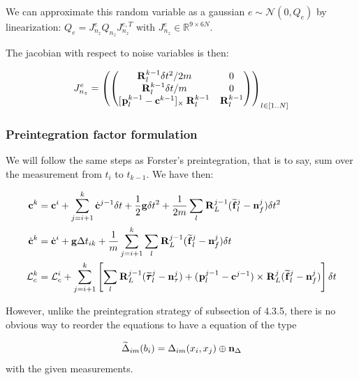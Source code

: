 \documentclass[11pt]{article}
\newcommand{\Rot}[2]{\prescript{#1}{}{\bfR}_{#2}}
\newcommand{\noise}{\bfn}
\newcommand{\posi}[2]{\prescript{#1}{}{\bfp}_{#2}}
\newcommand{\forcem}[2]{\prescript{#1}{}{\widetilde{\bff}}_{#2}}
\newcommand{\torquem}[2]{\prescript{#1}{}{\widetilde{\pmb{\tau}}}_{#2}}
\newcommand{\AM}{\mathcal{L}}
\newcommand{\COM}{\bfc}
\newcommand{\COMd}{\dot{\bfc}}
\newcommand{\Gaussian}[2]{\mathcal{N}({#1},{#2})}
\newcommand{\Reals}{\mathbb{R}}
\begin{document}
We can approximate this random variable as a gaussian $e \sim \Gaussian{0}{Q_e}$ by linearization: $Q_e = J^e_{n_z} Q_{n_z} J^{e,T}_{n_z}$ with $J^e_{n_z} \in \Reals^{9 \times 6N}$.

The jacobian with respect to noise variables is then:

\begin{equation}
	J^e_{n_z}=
	\left(
	\begin{pmatrix}
	\Rot{}{l}^{k-1} \delta t^2/2m & 0
	\\
	\Rot{}{l}^{k-1} \delta t/m & 0
	\\
	[\posi{}{l}^{k-1} - \COM^{k-1}]_{\times} \Rot{}{l}^{k-1} & \Rot{}{l}^{k-1}
	\end{pmatrix}
	\right)_{l \in [1..N]}
\end{equation}


\subsubsection{Preintegration factor formulation}

We will follow the same steps as Forster's preintegration, that is to say, sum over the measurement from $t_i$ to $t_{k-1}$. We have then:





\begin{equation}
\begin{split}
	\COM^{k} &= \COM^{i} + \sum_{j=i+1}^{k}\COMd^{j-1} \delta t 
	+ \frac{1}{2} \bfg \delta t^2 + \frac{1}{2m} \sum_l \Rot{}{L}^{j-1} (\forcem{}{l}^{j} - \noise_f^{j}) \delta t^2
	\\
	\COMd^{k}&= \COMd^{i} + \bfg \Delta t_{ik} + \frac{1}{m}  \sum_{j=i+1}^{k} \sum_l \Rot{}{L}^{j-1} (\forcem{}{l}^{j} - \noise_f^{j}) \delta t 
	\\
	\AM_c^{k} &= \AM_c^{i} +  \sum_{j=i+1}^{k} \left[ 
	\sum_l \Rot{}{L}^{j-1}(\torquem{}{l}^{j} - \noise_{\tau}^{j}) + (\posi{}{l}^{j-1} - \COM^{j-1}) \times \Rot{}{L}^{j}(\forcem{}{l}^{j} - \noise_f^{j}) 
	\right] \delta t
\end{split}
\label{eq:COMDiscreteFeet}
\end{equation}


However, unlike the preintegration strategy of subsection of 4.3.5, there is no obvious way to reorder the equations to have a equation of the type

\begin{equation}
\widetilde{\Delta}_{im}(b_i) = \Delta_{im}(x_i, x_j) \oplus  \noise_{\Delta} 
\end{equation}
with the given measurements. 
\end{document}
